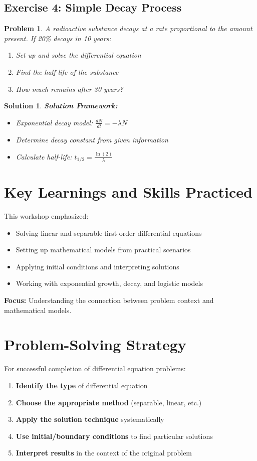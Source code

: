 \documentclass[12pt, letterpaper]{book}
\newcounter{problemcounter}[chapter]
\theoremstyle{problemstyle}
\newtheorem{problem}[problemcounter]{Problem}
\theoremstyle{solutionstyle}
\newtheorem*{solution}{Solution}
\begin{document}
\subsection{Exercise 4: Simple Decay Process}

\begin{problem}
A radioactive substance decays at a rate proportional to the amount present. If 20\% decays in 10 years:
\begin{enumerate}
    \item Set up and solve the differential equation
    \item Find the half-life of the substance
    \item How much remains after 30 years?
\end{enumerate}
\end{problem}

\begin{solution}
\textbf{Solution Framework:}
\begin{itemize}
    \item Exponential decay model: $\frac{dN}{dt} = -\lambda N$
    \item Determine decay constant from given information
    \item Calculate half-life: $t_{1/2} = \frac{\ln(2)}{\lambda}$
\end{itemize}
\end{solution}

\section{Key Learnings and Skills Practiced}
This workshop emphasized:
\begin{itemize}
    \item Solving linear and separable first-order differential equations
    \item Setting up mathematical models from practical scenarios
    \item Applying initial conditions and interpreting solutions
    \item Working with exponential growth, decay, and logistic models
\end{itemize}

\textbf{Focus:} Understanding the connection between problem context and mathematical models.

\section{Problem-Solving Strategy}
For successful completion of differential equation problems:
\begin{enumerate}
    \item \textbf{Identify the type} of differential equation
    \item \textbf{Choose the appropriate method} (separable, linear, etc.)
    \item \textbf{Apply the solution technique} systematically
    \item \textbf{Use initial/boundary conditions} to find particular solutions
    \item \textbf{Interpret results} in the context of the original problem
\end{enumerate}
\end{document}
